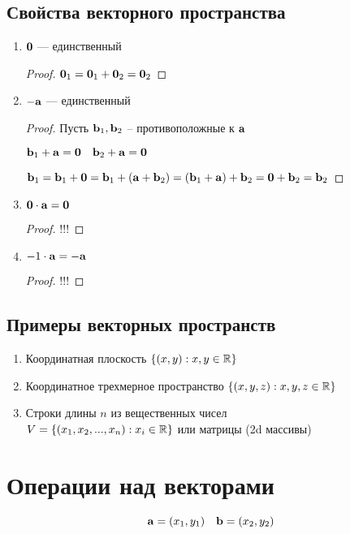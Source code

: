 \documentclass[main]{subfiles}
\begin{document}
\subsection{Свойства векторного пространства}

\begin{enumerate}
    \item $\mathbf{0}$ --- единственный \begin{proof}
              $\mathbf{0}_1 = \mathbf{0}_1 + \mathbf{0}_2 = \mathbf{0}_2$
          \end{proof}
    \item $-\mathbf{a}$ --- единственный \begin{proof}
              Пусть $\mathbf{b}_1, \mathbf{b}_2$ -- противоположные к $\mathbf{a}$

              $\mathbf{b}_1 + \mathbf{a} = \mathbf{0} \quad \mathbf{b}_2 + \mathbf{a} = \mathbf{0}$

              $\mathbf{b}_1 = \mathbf{b}_1 + \mathbf{0} = \mathbf{b}_1 + (\mathbf{a} + \mathbf{b}_2) = (\mathbf{b}_1+\mathbf{a})+\mathbf{b}_2 = \mathbf{0} +\mathbf{b}_2 = \mathbf{b}_2$
          \end{proof}
    \item $\mathbf{0}\cdot \mathbf{a} = \mathbf{0}$ \begin{proof}
              !!!
          \end{proof}
    \item $-1\cdot \mathbf{a} = -\mathbf{a}$ \begin{proof}
              !!!
          \end{proof}
\end{enumerate}

\subsection{Примеры векторных пространств}
\begin{enumerate}
    \item Координатная плоскость $\{(x,y): x,y\in \mathbb{R}\}$
    \item Координатное трехмерное пространство $\{(x,y,z): x,y,z\in \mathbb{R}\}$
    \item Строки длины $n$ из вещественных чисел \\
          $V = \{(x_1, x_2, ..., x_n): x_i \in \mathbb{R}\}$ или матрицы (2d массивы)
\end{enumerate}

\section{Операции над векторами}
\begin{equation*}
    \mathbf{a} = (x_1, y_1) \quad \mathbf{b} = (x_2, y_2)
\end{equation*}
\end{document}
